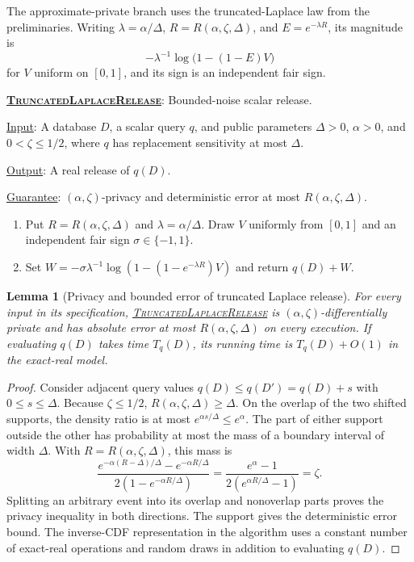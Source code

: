 \documentclass[11pt]{article}
\newenvironment{fminipage}%
  {\begin{Sbox}\begin{minipage}}%
  {\end{minipage}\end{Sbox}\fbox{\TheSbox}}
\newenvironment{algbox}[0]{%
\vskip 0.2in
\noindent
\begin{fminipage}{6.3in}
}{%
\end{fminipage}
\vskip 0.2in
}
\newtheorem{lemma}{Lemma}[section]
\begin{document}
The approximate-private branch uses the truncated-Laplace law from the
preliminaries.  Writing
$\lambda=\alpha/\Delta$, $R=R(\alpha,\zeta,\Delta)$, and
$E=e^{-\lambda R}$, its magnitude is
\[
 -\lambda^{-1}\log\bigl(1-(1-E)V\bigr)
\]
for $V$ uniform on $[0,1]$, and its sign is an independent fair sign.

\begin{algbox}
\textbf{\uline{\textsc{TruncatedLaplaceRelease}}}: Bounded-noise scalar
release.  \label{alg:truncated-laplace-release}

\uline{Input}: A database $D$, a scalar query $q$, and public parameters
$\Delta>0$, $\alpha>0$, and $0<\zeta\le1/2$, where $q$ has replacement
sensitivity at most $\Delta$.

\uline{Output}: A real release of $q(D)$.

\uline{Guarantee}: $(\alpha,\zeta)$-privacy and deterministic error at most
$R(\alpha,\zeta,\Delta)$.

\begin{enumerate}[leftmargin=*,nosep]
  \item Put $R=R(\alpha,\zeta,\Delta)$ and $\lambda=\alpha/\Delta$.
  Draw $V$ uniformly from $[0,1]$ and an independent fair sign
  $\sigma\in\{-1,1\}$.
  \item Set
  $W=-\sigma\lambda^{-1}
  \log(1-(1-e^{-\lambda R})V)$ and return $q(D)+W$.
\end{enumerate}
\end{algbox}

\begin{lemma}[Privacy and bounded error of truncated Laplace release]
\label{lem:truncated-laplace}
For every input in its specification,
\hyperref[alg:truncated-laplace-release]{\textsc{TruncatedLaplaceRelease}}
is $(\alpha,\zeta)$-differentially private and has absolute error at most
$R(\alpha,\zeta,\Delta)$ on every execution.  If evaluating $q(D)$ takes
time $T_q(D)$, its running time is $T_q(D)+O(1)$ in the exact-real model.
\end{lemma}

\begin{proof}
Consider adjacent query values $q(D)\le q(D')=q(D)+s$ with
$0\le s\le\Delta$.  Because $\zeta\le1/2$,
$R(\alpha,\zeta,\Delta)\ge\Delta$.  On the overlap of the two shifted
supports, the density ratio is at most
$e^{\alpha s/\Delta}\le e^\alpha$.  The part of either support outside the
other has probability at most the mass of a boundary interval of width
$\Delta$.  With $R=R(\alpha,\zeta,\Delta)$, this mass is
\[
 \frac{e^{-\alpha(R-\Delta)/\Delta}-e^{-\alpha R/\Delta}}
      {2(1-e^{-\alpha R/\Delta})}
 =\frac{e^\alpha-1}{2(e^{\alpha R/\Delta}-1)}
 =\zeta.
\]
Splitting an arbitrary event into its overlap and nonoverlap parts proves
the privacy inequality in both directions.  The support gives the
deterministic error bound.  The inverse-CDF representation in the algorithm
uses a constant number of exact-real operations and random draws in addition
to evaluating $q(D)$.
\end{proof}
\end{document}
